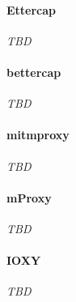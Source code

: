 \paragraph{Ettercap} \emph{TBD}
\paragraph{bettercap} \emph{TBD}
\paragraph{mitmproxy} \emph{TBD}
\paragraph{mProxy} \emph{TBD}
\paragraph{IOXY} \emph{TBD}

